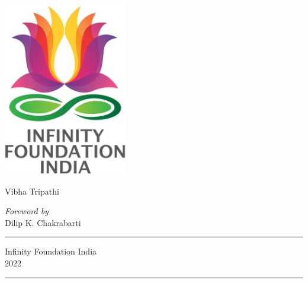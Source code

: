 \thispagestyle{empty}\label{titlepage}
\begin{center}
\includegraphics[scale=0.3]{images/logo.png}
\bigskip


\bigskip
\end{center}
\medskip

\begin{center}
{\fontsize{20}{24}\selectfont {History of Iron Technology in India}}

\medskip

{\fontsize{11}{15}\selectfont {(From Beginning to Pre-modern Times)}}

\vfill


\bigskip
 
{\fontsize{11}{15}\selectfont 
Vibha Tripathi}\par

\bigskip
 
{\fontsize{8}{10}\selectfont 
{\textit{Foreword by}}\\[3pt]
Dilip K. Chakrabarti}\par
\vfill

\rule{5cm}{1pt}

{\fontsize{12}{14}\selectfont
Infinity Foundation India\\[4pt]
2022}

\rule{5cm}{1pt}
\end{center}

\label{endtitlepage}


